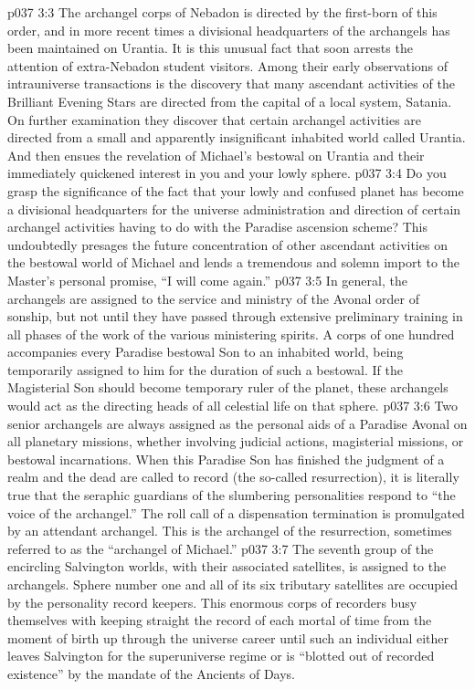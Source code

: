 \pc \vs p037 3:3 The archangel corps of Nebadon is directed by the first\hyp{}born of this order, and in more recent times a divisional headquarters of the archangels has been maintained on Urantia. It is this unusual fact that soon arrests the attention of extra\hyp{}Nebadon student visitors. Among their early observations of intrauniverse transactions is the discovery that many ascendant activities of the Brilliant Evening Stars are directed from the capital of a local system, Satania. On further examination they discover that certain archangel activities are directed from a small and apparently insignificant inhabited world called Urantia. And then ensues the revelation of Michael’s bestowal on Urantia and their immediately quickened interest in you and your lowly sphere.
\vs p037 3:4 Do you grasp the significance of the fact that your lowly and confused planet has become a divisional headquarters for the universe administration and direction of certain archangel activities having to do with the Paradise ascension scheme? This undoubtedly presages the future concentration of other ascendant activities on the bestowal world of Michael and lends a tremendous and solemn import to the Master’s personal promise, \textcolor{ubdarkred}{“I will come again.”}
\pc \vs p037 3:5 In general, the archangels are assigned to the service and ministry of the Avonal order of sonship, but not until they have passed through extensive preliminary training in all phases of the work of the various ministering spirits. A corps of one hundred accompanies every Paradise bestowal Son to an inhabited world, being temporarily assigned to him for the duration of such a bestowal. If the Magisterial Son should become temporary ruler of the planet, these archangels would act as the directing heads of all celestial life on that sphere.
\vs p037 3:6 Two senior archangels are always assigned as the personal aids of a Paradise Avonal on all planetary missions, whether involving judicial actions, magisterial missions, or bestowal incarnations. When this Paradise Son has finished the judgment of a realm and the dead are called to record (the so\hyp{}called resurrection), it is literally true that the seraphic guardians of the slumbering personalities respond to “the voice of the archangel.” The roll call of a dispensation termination is promulgated by an attendant archangel. This is the archangel of the resurrection, sometimes referred to as the “archangel of Michael.”
\pc \vs p037 3:7  The seventh group of the encircling Salvington worlds, with their associated satellites, is assigned to the archangels. Sphere number one and all of its six tributary satellites are occupied by the personality record keepers. This enormous corps of recorders busy themselves with keeping straight the record of each mortal of time from the moment of birth up through the universe career until such an individual either leaves Salvington for the superuniverse regime or is “blotted out of recorded existence” by the mandate of the Ancients of Days.
